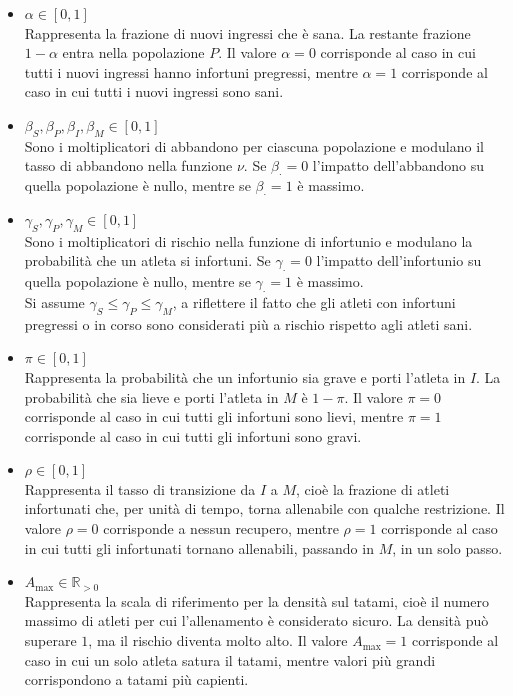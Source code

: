 \begin{itemize}
    \item $\alpha \in [0, 1]$ \\
        Rappresenta la frazione di nuovi ingressi che è sana. La restante frazione $1-\alpha$ entra nella popolazione $P$. Il valore $\alpha = 0$ corrisponde al caso in cui tutti i nuovi ingressi hanno infortuni pregressi, mentre $\alpha = 1$ corrisponde al caso in cui tutti i nuovi ingressi sono sani.
    \item $\beta_S, \beta_P, \beta_I, \beta_M \in [0, 1]$ \\
        Sono i moltiplicatori di abbandono per ciascuna popolazione e modulano il tasso di abbandono nella funzione $\nu$. Se $\beta_\cdot = 0$ l'impatto dell'abbandono su quella popolazione è nullo, mentre se $\beta_\cdot = 1$ è massimo.
    \item $\gamma_S, \gamma_P, \gamma_M \in [0, 1]$ \\
        Sono i moltiplicatori di rischio nella funzione di infortunio e modulano la probabilità che un atleta si infortuni. Se $\gamma_\cdot = 0$ l'impatto dell'infortunio su quella popolazione è nullo, mentre se $\gamma_\cdot = 1$ è massimo. \\
        Si assume $\gamma_S \leq \gamma_P \leq \gamma_M$, a riflettere il fatto che gli atleti con infortuni pregressi o in corso sono considerati più a rischio rispetto agli atleti sani.
    \item $\pi \in [0, 1]$ \\
        Rappresenta la probabilità che un infortunio sia grave e porti l'atleta in $I$. La probabilità che sia lieve e porti l'atleta in $M$ è $1-\pi$. Il valore $\pi = 0$ corrisponde al caso in cui tutti gli infortuni sono lievi, mentre $\pi = 1$ corrisponde al caso in cui tutti gli infortuni sono gravi.
    \item $\rho \in [0, 1]$ \\
        Rappresenta il tasso di transizione da $I$ a $M$, cioè la frazione di atleti infortunati che, per unità di tempo, torna allenabile con qualche restrizione. Il valore $\rho = 0$ corrisponde a nessun recupero, mentre $\rho = 1$ corrisponde al caso in cui tutti gli infortunati tornano allenabili, passando in $M$, in un solo passo.
    \item $A_{\max} \in \mathbb{R}_{>0}$ \\
        Rappresenta la scala di riferimento per la densità sul tatami, cioè il numero massimo di atleti per cui l'allenamento è considerato sicuro. La densità può superare $1$, ma il rischio diventa molto alto. Il valore $A_{\max} = 1$ corrisponde al caso in cui un solo atleta satura il tatami, mentre valori più grandi corrispondono a tatami più capienti.

\end{itemize}
